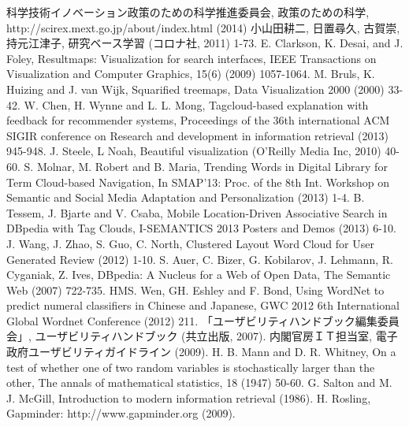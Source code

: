 \documentclass[sotsuron]{kuee}
\begin{document}
\begin{thebibliography}{20}
科学技術イノベーション政策のための科学推進委員会, 政策のための科学, http://scirex.mext.go.jp/about/index.html (2014)
 小山田耕二, 日置尋久, 古賀崇, 持元江津子, 研究ベース学習 (コロナ社, 2011) 1-73.
 E. Clarkson, K. Desai, and J. Foley, Resultmaps: Visualization for search interfaces, IEEE Transactions on Visualization and Computer Graphics, 15(6) (2009) 1057-1064.
M. Bruls, K. Huizing and J. van Wijk, Squarified treemaps, Data Visualization 2000 (2000) 33-42.
W. Chen, H. Wynne and L. L. Mong, Tagcloud-based explanation with feedback for recommender systems, Proceedings of the 36th international ACM SIGIR conference on Research and development in information retrieval (2013) 945-948.
 J. Steele, L Noah, Beautiful visualization (O'Reilly Media Inc, 2010) 40-60.
 S. Molnar, M. Robert and B. Maria, Trending Words in Digital Library for Term Cloud-based Navigation, In SMAP’13: Proc. of the 8th Int. Workshop on Semantic and Social Media Adaptation and Personalization (2013) 1-4.
B. Tessem, J. Bjarte and V. Csaba, Mobile Location-Driven Associative Search in DBpedia with Tag Clouds, I-SEMANTICS 2013 Posters and Demos (2013) 6-10.
J. Wang, J. Zhao, S. Guo, C. North, Clustered Layout Word Cloud for User Generated Review (2012) 1-10.
S. Auer, C. Bizer, G. Kobilarov, J. Lehmann, R. Cyganiak, Z. Ives, DBpedia: A Nucleus for a Web of Open Data, The Semantic Web (2007) 722-735.
HMS. Wen, GH. Eshley and F. Bond, Using WordNet to predict numeral classifiers in Chinese and Japanese, GWC 2012 6th International Global Wordnet Conference (2012) 211.
「ユーザビリティハンドブック編集委員会」, ユーザビリティハンドブック (共立出版, 2007).
内閣官房ＩＴ担当室, 電子政府ユーザビリティガイドライン (2009).
 H. B. Mann and D. R. Whitney, On a test of whether one of two random variables is stochastically larger than the other, The annals of mathematical statistics, 18 (1947) 50-60.
 G. Salton and M. J. McGill, Introduction to modern information retrieval (1986).
 H. Rosling, Gapminder: http://www.gapminder.org (2009).
\end{thebibliography}
\end{document}
